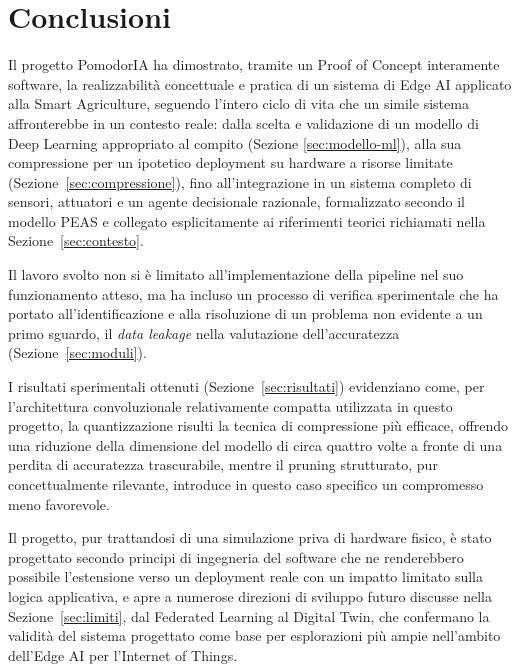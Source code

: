 \section{Conclusioni}
\label{sec:conclusioni}

Il progetto PomodorIA ha dimostrato, tramite un Proof of Concept interamente
software, la realizzabilità concettuale e pratica di un sistema di Edge AI
applicato alla Smart Agriculture, seguendo l'intero ciclo di vita che un
simile sistema affronterebbe in un contesto reale: dalla scelta e
validazione di un modello di Deep Learning appropriato al compito (Sezione
\ref{sec:modello-ml}), alla sua compressione per un ipotetico deployment su
hardware a risorse limitate (Sezione~\ref{sec:compressione}), fino
all'integrazione in un sistema completo di sensori, attuatori e un agente
decisionale razionale, formalizzato secondo il modello PEAS e collegato
esplicitamente ai riferimenti teorici richiamati nella
Sezione~\ref{sec:contesto}.

Il lavoro svolto non si è limitato all'implementazione della pipeline nel
suo funzionamento atteso, ma ha incluso un processo di verifica
sperimentale che ha portato all'identificazione e alla risoluzione di un
problema non evidente a un primo sguardo, il \emph{data leakage} nella
valutazione dell'accuratezza (Sezione~\ref{sec:moduli}).

I risultati sperimentali ottenuti (Sezione~\ref{sec:risultati}) evidenziano
come, per l'architettura convoluzionale relativamente compatta utilizzata in
questo progetto, la quantizzazione risulti la tecnica di compressione più
efficace, offrendo una riduzione della dimensione del modello di circa
quattro volte a fronte di una perdita di accuratezza trascurabile, mentre il
pruning strutturato, pur concettualmente rilevante, introduce in questo
caso specifico un compromesso meno favorevole.

Il progetto, pur trattandosi di una simulazione priva di hardware fisico,
è stato progettato secondo principi di ingegneria del software che ne
renderebbero possibile l'estensione verso un deployment reale con un
impatto limitato sulla logica applicativa, e apre a numerose direzioni di
sviluppo futuro discusse nella Sezione~\ref{sec:limiti}, dal
Federated Learning al Digital Twin, che confermano la validità del sistema
progettato come base per esplorazioni più ampie nell'ambito dell'Edge AI
per l'Internet of Things.
